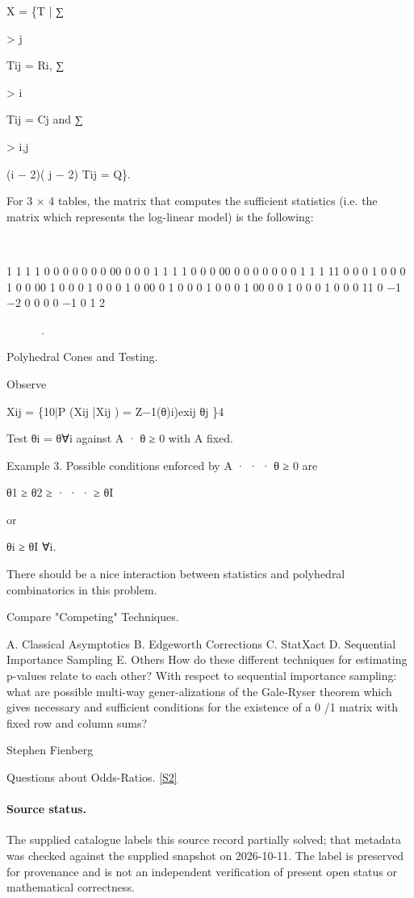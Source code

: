 \documentclass[11pt]{article}
\newcommand{\sref}[2]{\hyperlink{source:#1:#2}{[S#2]}}
\begin{document}
X = \{T | ∑

> j

Tij = Ri, ∑

> i

Tij = Cj and ∑

> i,j

(i − 2)( j − 2) Tij = Q\}.

For 3 × 4 tables, the matrix that computes the sufficient statistics (i.e. the matrix which represents the log-linear model) is the following:



1 1 1 1 0 0 0 0 0 0 0 00 0 0 0 1 1 1 1 0 0 0 00 0 0 0 0 0 0 0 1 1 1 11 0 0 0 1 0 0 0 1 0 0 00 1 0 0 0 1 0 0 0 1 0 00 0 1 0 0 0 1 0 0 0 1 00 0 0 1 0 0 0 1 0 0 0 11 0 −1 −2 0 0 0 0 −1 0 1 2

.

Polyhedral Cones and Testing.

Observe

Xij = \{10|P (Xij |Xij ) = Z−1(θ)i)exij θj \}4

Test θi = θ∀i against A · θ ≥ 0 with A fixed.

Example 3. Possible conditions enforced by A · · · θ ≥ 0 are

θ1 ≥ θ2 ≥ · · · ≥ θI

or

θi ≥ θI ∀i.

There should be a nice interaction between statistics and polyhedral combinatorics in this problem.

Compare "Competing" Techniques.

A. Classical Asymptotics B. Edgeworth Corrections C. StatXact D. Sequential Importance Sampling E. Others How do these different techniques for estimating p-values relate to each other? With respect to sequential importance sampling: what are possible multi-way gener-alizations of the Gale-Ryser theorem which gives necessary and sufficient conditions for the existence of a 0 /1 matrix with fixed row and column sums?

Stephen Fienberg

Questions about Odds-Ratios. \sref{20001179}{2}
\paragraph{Source status.}
The supplied catalogue labels this source record partially solved; that metadata was checked against the supplied snapshot on 2026-10-11. The label is preserved for provenance and is not an independent verification of present open status or mathematical correctness.
\end{document}
